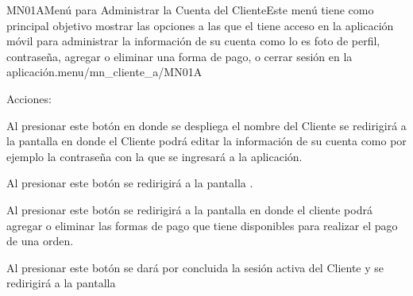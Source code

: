 \begin{IU}{MN01A}{Menú para Administrar la Cuenta del Cliente}{Este menú tiene como principal objetivo mostrar las opciones a las que el  tiene acceso en la aplicación móvil para administrar la información de su cuenta como lo es foto de perfil, contraseña, agregar o eliminar una forma de pago, o cerrar sesión en la aplicación.}{menu/mn_cliente_a/MN01A}
	\item[Acciones:]\hspace{1pt}
	\begin{Citemize}
		\item \userAccountIcon{} Al presionar este botón en donde se despliega el nombre del Cliente se redirigirá a la pantalla  en donde el Cliente podrá editar la información de su cuenta como por ejemplo la contraseña con la que se ingresará a la aplicación.
		\item \bellIcon{} Al presionar este botón se redirigirá a la pantalla .
		\item {} Al presionar este botón se redirigirá a la pantalla  en donde el cliente podrá agregar o eliminar las formas de pago que tiene disponibles para realizar el pago de una orden.
		\item {} Al presionar este botón se dará por concluida la sesión activa del Cliente y se redirigirá a la pantalla 
	\end{Citemize}
\end{IU}